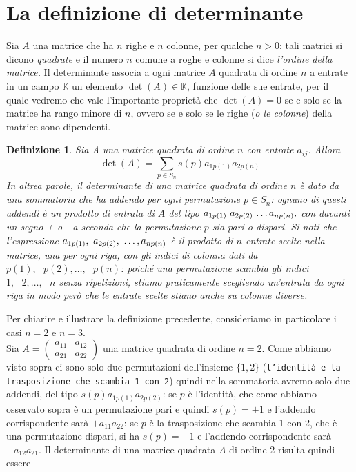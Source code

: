 \documentclass{book}
\newtheorem{definizione}{Definizione}
\begin{document}
\section{La definizione di determinante}
Sia $A$ una matrice che ha $n$ righe e $n$ colonne, per qualche $n>0$: tali matrici si dicono {\it quadrate} e il numero $n$ comune a roghe e colonne si dice {\it l'ordine della matrice.} Il determinante associa a ogni matrice $A$ quadrata di ordine $n$ a entrate in un campo $\mathds{K}$ un elemento $\det(A) \in \mathds{K}$, funzione delle sue entrate, per il quale vedremo che vale l'importante proprietà che $\det(A)=0$ se e solo se la matrice ha rango minore di $n$, ovvero se e solo se le righe ({\it o le colonne}) della matrice sono dipendenti.
\begin{definizione}
  Sia A una matrice quadrata di ordine $n$ con entrate $a_{ij}$. Allora
  \begin{equation}
	\det(A)=\sum_{p\in S_n}s(p)a_{1p(1)}a_{2p(n)}
  \end{equation}
  In altrea parole, il determinante di una matrice quadrata di ordine $n$ è dato da una sommatoria che ha addendo per ogni permutazione $p\in S_n$: ognuno di questi addendi è un prodotto di entrata di $A$ del tipo $a_{1p(1)}\text{ } a_{2p(2)} \text{ \dots } a_{np(n)},$ con davanti un segno + o - a seconda che la permutazione $p$ sia pari o dispari. Si noti che l'espressione $a_{1p(1)},\text{ } a_{2p(2)}, \text{ \dots }, a_{np(n)}$ è il prodotto di $n$ entrate scelte nella matrice, una per ogni riga, con gli indici di colonna dati da $p(1),\text{ } p(2),\dots, \text{ } p(n)$: poiché una permutazione scambia gli indici $1,\text{ }2,\dots, \text{ } n$ senza ripetizioni, stiamo praticamente scegliendo un'entrata da ogni riga in modo però che le entrate scelte stiano anche su colonne diverse.
\end{definizione}
Per chiarire e illustrare la definizione precedente, consideriamo in particolare i casi $n = 2$ e $n = 3$.\\
Sia $A=\begin{pmatrix}
         a_{11} & a_{12}\\
         a_{21} & a_{22}
       \end{pmatrix}$ una matrice quadrata di ordine $n=2$. Come abbiamo visto sopra ci sono solo due permutazioni dell'insieme $\{1,2\}$ ({\tt l'identità e la trasposizione che scambia 1 con 2}) quindi nella sommatoria avremo solo due addendi, del tipo $s(p) a_{1p(1)}a_{2p(2)}$: se $p$ è l'identità, che come abbiamo osservato sopra è un permutazione pari e quindi $s(p)=+1$ e l'addendo corrispondente sarà $+a_{11}a_{22}$: se $p$ è la trasposizione che scambia 1 con 2, che è una permutazione dispari, si ha $s(p)=-1$ e l'addendo corrispondente sarà $-a_{12}a_{21}$. Il determinante di una matrice quadrata $A$ di ordine 2 risulta quindi essere
\end{document}
